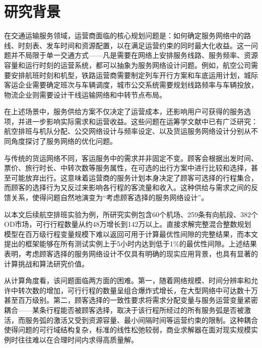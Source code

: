 \label{sec:introduction}

\section{研究背景}

在交通运输服务领域，运营商面临的核心规划问题是：如何确定服务网络中的路线、时刻表、发车时间和资源配置，以在满足运营约束的同时最大化收益。这一问题并不局限于单一交通方式——凡是需要在网络上安排服务线路、服务频率、资源容量和运行时刻的运营系统，都可以抽象为服务网络设计问题。例如，航空公司需要安排航班时刻和机型，铁路运营商需要制定列车开行方案和车底运用计划，城际客运企业需要确定班次与车辆调度，城市公交系统需要规划线路频率与车辆投放，物流企业则需要设计干线运输网络和中转节点布局。

在上述场景中，服务供给方案不仅决定了运营成本，还影响用户可获得的服务选项，并进一步影响实际需求和运营收益。这些问题在运筹学文献中已有广泛研究：航空排班与机队分配\citep{sherali2006fleet, eltoukhy2017airline}、公交网络设计与频率设定\citep{ceder2007public, guihaire2008transit}、以及货运服务网络设计\citep{crainic2000service, wieberneit2008service}分别从不同角度探讨了服务网络的优化问题。

与传统的货运网络不同，客运服务中的需求并非固定不变。顾客会根据出发时间、票价、旅行时长、中转次数等服务属性，在可选的出行方案中进行比较和选择，甚至可能放弃出行\citep{benakiva1985discrete, train2009discrete}。这意味着运营商的服务计划本身决定了顾客可选择的行程集合，而顾客的选择行为又反过来影响各行程的客流量和收入。这种供给与需求之间的反馈关系，使得问题自然地演变为“考虑顾客选择的服务网络设计”。

以本文后续航空排班实验为例，所研究实例包含60个机场、259条有向航段、382个OD市场，可行行程数量从约48万增长到142万以上。直接求解完整混合整数规划模型在百万级行程变量规模下难以返回可用于计算最优性间隙的完整结果，而本文提出的\algoNotation 框架能够在所有测试实例上于5小时内达到低于1\%的最优性间隙。上述结果表明，考虑顾客选择的服务网络设计不仅具有明确的现实应用背景，也具有显著的计算挑战和算法研究价值。

从计算角度看，该问题面临两方面的困难。第一，随着网络规模、时间分辨率和允许中转次数的增加，可行行程的数量呈组合爆炸式增长，在大型网络中可达数十万甚至百万级别。第二，顾客选择的一致性要求将需求分配变量与服务运营变量紧密耦合——某条行程能否被顾客选择，取决于该行程所经过的所有服务弧是否被激活，而服务弧的激活又受到资源容量、最小间隔时间等运营约束的限制。这种耦合使得问题的可行域结构复杂，标准的线性松弛较弱，商业求解器在面对现实规模实例时往往难以在合理时间内求得高质量解。

